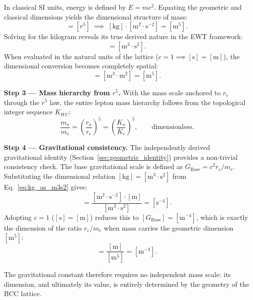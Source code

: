 \documentclass[10pt,a4paper]{article}
\begin{document}
In classical SI units, energy is defined by $E = m c^2$.
Equating the geometric and classical dimensions yields the
dimensional structure of mass:
\begin{equation}
	[m \cdot c^2] = [r^5]
	\;\implies\;
	[\text{kg}] \cdot [\text{m}^2 \cdot \text{s}^{-2}] = [\text{m}^5].
\end{equation}
Solving for the kilogram reveals its true derived nature in the
EWT framework:
\begin{equation}
	[\text{kg}] = [\text{m}^3 \cdot \text{s}^2].
\end{equation}
When evaluated in the natural units of the lattice
($c = 1 \implies [\text{s}] = [\text{m}]$), the dimensional
conversion becomes completely spatial:
\begin{equation}
	[\text{kg}] = [\text{m}^3 \cdot \text{m}^2] = [\text{m}^5].
	\label{eq:kg_as_m3s2}
\end{equation}

\textbf{Step 3 — Mass hierarchy from $r^5$.}
With the mass scale anchored to $r_e$ through the $r^5$ law, the
entire lepton mass hierarchy follows from the topological integer
sequence $K_{WC}$:
\begin{equation}
	\frac{m_x}{m_e} = \left(\frac{r_x}{r_e}\right)^5
	= \left(\frac{K_x}{K_e}\right)^5,
	\qquad \text{dimensionless.}
\end{equation}

\textbf{Step 4 — Gravitational consistency.}
The independently derived gravitational identity
(Section~\ref{sec:geometric_identity}) provides a non‑trivial
consistency check.  The base gravitational scale is defined as
$G_{\text{Base}} = c^2 r_e / m_e$.  Substituting the dimensional
relation $[\text{kg}] = [\text{m}^3 \cdot \text{s}^2]$ from
Eq.~\eqref{eq:kg_as_m3s2} gives:
\begin{equation}
	[G_{\text{Base}}]
	= \frac{[\text{m}^2 \cdot \text{s}^{-2}] \cdot [\text{m}]}
	{[\text{m}^3 \cdot \text{s}^2]}
	= [\text{s}^{-4}].
\end{equation}
Adopting $c = 1$ ($[\text{s}] = [\text{m}]$) reduces this to
$[G_{\text{Base}}] = [\text{m}^{-4}]$, which is exactly the
dimension of the ratio $r_e / m_e$ when mass carries the
geometric dimension $[\text{m}^5]$:
\begin{equation}
	[r_e / m_e] = \frac{[\text{m}]}{[\text{m}^5]} = [\text{m}^{-4}].
\end{equation}

The gravitational constant therefore requires no independent
mass scale: its dimension, and ultimately its value, is entirely
determined by the geometry of the BCC lattice.
\end{document}
